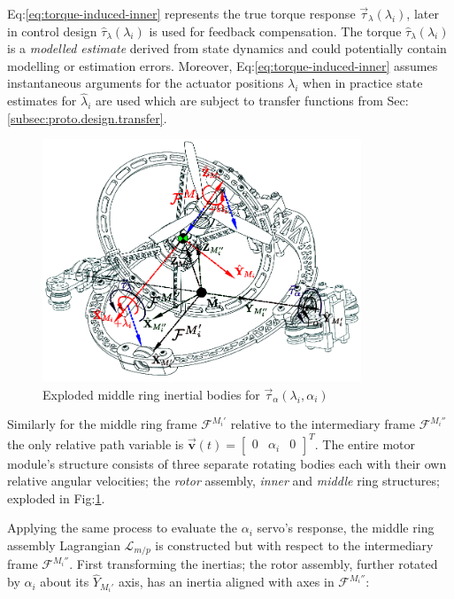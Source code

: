 Eq:\ref{eq:torque-induced-inner} represents the true torque response $\vec{\tau}_\lambda(\lambda_i)$, later in control design $\hat{\tau}_\lambda(\lambda_i)$ is used for feedback compensation. The torque $\hat{\tau}_\lambda(\lambda_i)$ is a \emph{modelled estimate} derived from state dynamics and could potentially contain modelling or estimation errors. Moreover, Eq:\ref{eq:torque-induced-inner} assumes instantaneous arguments for the actuator positions $\lambda_i$ when in practice state estimates for $\hat{\lambda}_i$ are used which are subject to transfer functions from Sec:\ref{subsec:proto.design.transfer}.
\begin{figure}[htbp]
\vspace{-10pt}
\centering
\includegraphics[width=0.85\textwidth]{figs/response-middle}
\vspace{-12pt}
\caption{Exploded middle ring inertial bodies for $\vec{\tau}_{\alpha}(\lambda_i,\alpha_i)$}
\label{fig:response-middle}
\vspace{-16pt}
\end{figure}
\par
Similarly for the middle ring frame $\mathcal{F}^{M_i'}$ relative to the intermediary frame $\mathcal{F}^{M_i''}$ the only relative path variable is $\vec{\mathbf{v}}(t)=\begin{bmatrix}0 & \alpha_i & 0\end{bmatrix}^T$. The entire motor module's structure consists of three separate rotating bodies each with their own relative angular velocities; the \emph{rotor} assembly, \emph{inner} and \emph{middle} ring structures; exploded in Fig:\ref{fig:response-middle}. 
\par
Applying the same process to evaluate the $ \alpha_i$ servo's response, the middle ring assembly Lagrangian $\mathcal{L}_{m/p}$ is constructed but with respect to the intermediary frame $\mathcal{F}^{M_i''}$. First transforming the inertias; the rotor assembly, further rotated by $\alpha_i$ about its $\hat{Y}_{M_i'}$ axis, has an inertia aligned with axes in $\mathcal{F}^{M_i''}$:
